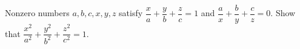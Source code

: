 Nonzero numbers $a,b,c,x,y,z$ satisfy $\dfrac xa+\dfrac yb+\dfrac zc=1$ and $\dfrac ax+\dfrac by+\dfrac cz=0$. Show that $\dfrac{x^2}{a^2}+\dfrac{y^2}{b^2}+\dfrac{z^2}{c^2}=1$.
